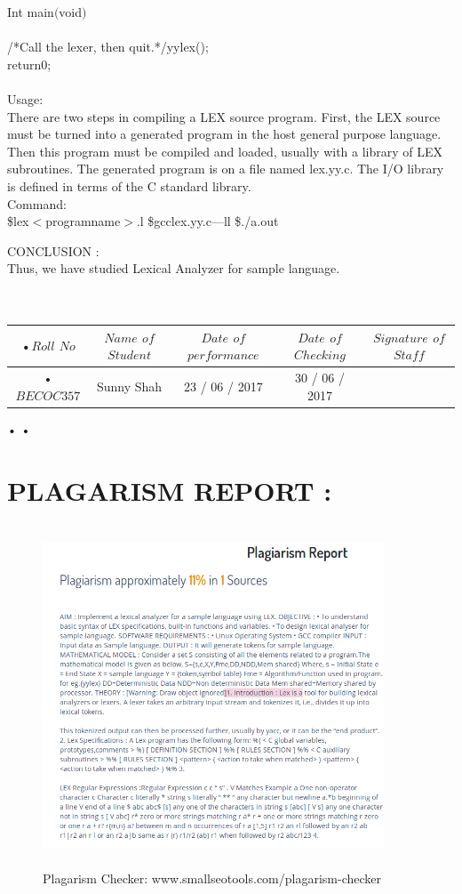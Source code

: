 \documentclass[11pt]{article}
\begin{document}
	Int main$($void$)$\\
	{\\
		/*Call the lexer, then quit.*/yylex();\\
		return0;\\
	}\\
	
	\noindent
	Usage:\\
	
	There are two steps in compiling a LEX source program. First, the LEX source must be turned into a generated program in the host general purpose language. Then this program must be compiled and loaded, usually with a library of LEX subroutines. The generated program is on a file named lex.yy.c. The I/O library is defined in terms of the C standard library.\\
	
	\noindent
	Command:\\
	
	\$lex$<$programname$>$.l
	\$gcclex.yy.c—ll
	\$./a.out
	
	\noindent
	CONCLUSION :\\
	
	Thus, we have studied Lexical Analyzer for sample language.\\\\\\
	
	\begin{tabular}{|c|c|c|c|c|}
		•$Roll$ $No$ & $Name$ $of$ $Student$ & $Date$ $of$ $performance$ & $Date$ $of$ $Checking$ & $Signature$ $of$ $Staff$ \\ \hline
		•$BECOC357$ & Sunny Shah& 23 / 06 / 2017& 30 / 06 / 2017 &  \\ \hline
	\end{tabular}•
	•
	\newpage
	\section{PLAGARISM REPORT :}
	\begin{figure}[h!]
		\centering
		\includegraphics[height=4in,width=4in]{plagiarism1.png}
		\caption{Plagarism Checker: www.smallseotools.com/plagarism-checker}
	\end{figure}
	\newpage
	
\end{document}
